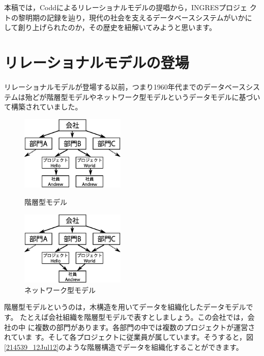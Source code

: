 本稿では，Coddによるリレーショナルモデルの提唱から，INGRESプロジェ
クトの黎明期の記録を辿り，現代の社会を支えるデータベースシステムがいかに
して創り上げられたのか，その歴史を紐解いてみようと思います。


\section{リレーショナルモデルの登場}


リレーショナルモデルが登場する以前，つまり1960年代までのデータベースシス
テムは殆どが階層型モデルやネットワーク型モデルというデータモデルに基づい
て構築されていました。


\begin{figure}[tb]
 \begin{minipage}{0.48\textwidth}
  \begin{center}
   \includegraphics[width=5cm]{hayamiz/images/hierarchical-data-model.eps}
   \caption{階層型モデル}
   \label{214539_12Jul12}
  \end{center}
 \end{minipage}
 \begin{minipage}{0.48\textwidth}
  \begin{center}
   \includegraphics[width=5cm]{hayamiz/images/network-data-model.eps}
   \caption{ネットワーク型モデル}
   \label{214707_12Jul12}
  \end{center}
 \end{minipage}
 \vspace*{-0.1\Cvs}
\end{figure}


階層型モデルというのは，木構造を用いてデータを組織化したデータモデルです。
たとえば会社組織を階層型モデルで表すとしましょう。この会社では，会社の中
に複数の部門があります。各部門の中では複数のプロジェクトが運営されていま
す。そして各プロジェクトに従業員が属しています。そうすると，図
\ref{214539_12Jul12}のような階層構造でデータを組織化することができます。


